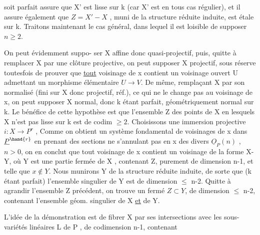 
 soit parfait assure que X' est lisse sur k (car X' est en tous cas
régulier), et il assure également que $Z = X' - X$ , muni de la structure
réduite induite, est étale sur k. Traitons maintenant le cas général,
dans lequel il est loisible de supposer $n \geqslant 2$.

 On peut évidemment suppo-%
ser X  affine donc quasi-projectif, puis, quitte à remplacer X
par une clôture projective, on peut supposer X projectif, sous réserve
toutesfois de prouver que \uline{tout} voisinage de x contient un voisinage
ouvert U admettant un morphisme élémentaire $U \to V$. De même, remplaçant
X par son normalisé (fini sur X donc projectif, réf.), ce qui ne le
change pas au voisinage de x, on peut supposer X normal, donc k étant
parfait, géométriquement normal sur k.  Le
bénéfice de cette hypothèse est que l'ensemble Z des points de X en
lesquels X n'est pas lisse sur k est de codim $\geqslant 2$. 
Choisissons une immersion projective $i : X \longrightarrow P^r$ , 
 Comme on obtient un système
fondamental de voisinages de x dans $\underline{P}^{\hand{r}}$ en prenant des sections ne
s'annulant pas en x des divers $\underline{O}_P(n)$ , $n > 0$, on en conclut que tout
voisinage de x contient un voisinage de la forme X-Y, où Y est une
partie fermée de X , contenant Z, purement de dimension n-1, et telle que
$x \notin Y$. Nous munirons Y de la structure réduite induite, de sorte que
(k étant parfait) l'ensemble singulier de Y est de dimension $\leqslant$ n-2. \margin{\unsure{$\nearrow$}}
Quitte à agrandir l'ensemble Z précédent, on trouve un fermé $Z \subset Y$, de
dimension $\leqslant$ n-2, contenant l'ensemble géom. singulier de X \uline{et} de Y.

L'idée de la démonstration est de fibrer X par ses intersections
avec les sous-variétés linéaires L de P , de codimension n-1, contenant

